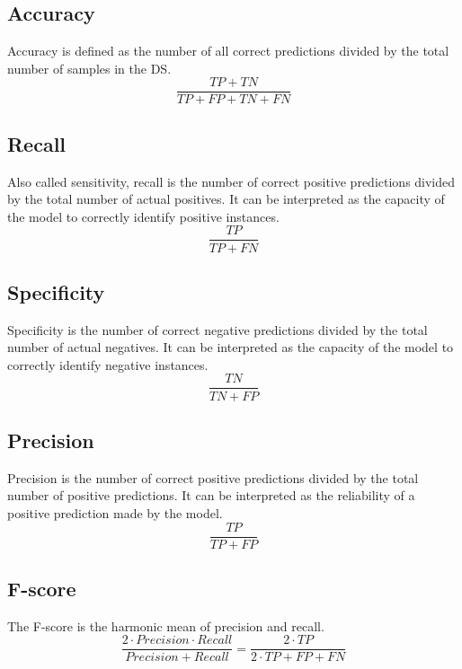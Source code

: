 \subsection{Accuracy}
\label{sub_sec_accuracy}
Accuracy is defined as the number of all correct predictions divided by the total number of samples in the \gls{DS}.
\begin{equation}
    \frac{TP + TN}{TP + FP + TN + FN}
\end{equation}

\subsection{Recall}
\label{sub_sec_recall}
Also called sensitivity, recall is the number of correct positive predictions divided by the total number of actual positives. It can be interpreted as the capacity of the model to correctly identify positive instances.
\begin{equation}
    \frac{TP}{TP + FN}
\end{equation}

\subsection{Specificity}
\label{sub_sec_specificity}
Specificity is the number of correct negative predictions divided by the total number of actual negatives. It can be interpreted as the capacity of the model to correctly identify negative instances.
\begin{equation}
    \frac{TN}{TN + FP}
\end{equation}

\subsection{Precision}
\label{sub_sec_precision}
Precision is the number of correct positive predictions divided by the total number of positive predictions. It can be interpreted as the reliability of a positive prediction made by the model.
\begin{equation}
    \frac{TP}{TP + FP}
\end{equation}

\subsection{F-score}
\label{sub_sec_fscore}
The F-score is the harmonic mean of precision and recall.
\begin{equation}
    \frac{2 \cdot Precision \cdot Recall}{Precision + Recall} = \frac{2 \cdot TP}{2 \cdot TP + FP + FN}
\end{equation}


